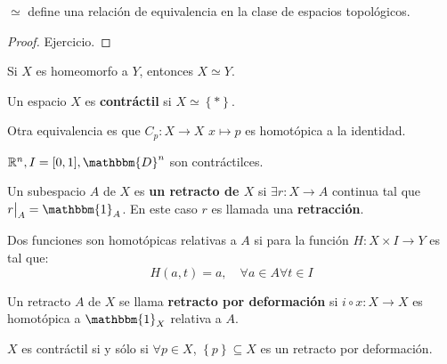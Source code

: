 \documentclass[12pt]{report}
\theoremstyle{largebreak}
\newcommand\cf[3]{\ensuremath{#1:#2\rightarrow#3}}
\newcommand{\bbm}[1]{\ensuremath{\mathbbm{#1}}}
\begin{document}
    \begin{obs}
        $\simeq$ define una relación de equivalencia en la clase de espacios topológicos.
    \end{obs}

    \begin{proof}
        Ejercicio.
    \end{proof}

    \begin{propo}
        Si $X$ es homeomorfo a $Y$, entonces $X\simeq Y$.
    \end{propo}

    \begin{mydef}
        Un espacio $X$ es \textbf{contráctil} si $X\simeq\left\{*\right\}$.
    \end{mydef}

    \begin{obs}
        Otra equivalencia es que $\cf{C_p}{X}{X}$ $x\mapsto p$ es homotópica a la identidad.
    \end{obs}

    \begin{exa}
        $\mathbb{R}^n,I=[0,1],\bbm{D}^n$ son contráctilces.
    \end{exa}

    \begin{mydef}
        Un subespacio $A$ de $X$ es \textbf{un retracto de $X$} si $\exists\cf{r}{X}{A}$ continua tal que $r\big|_A=\bbm{1}_A$. En este caso $r$ es llamada una \textbf{retracción}.
    \end{mydef}

    \begin{mydef}
        Dos funciones son homotópicas relativas a $A$ si para la función $\cf{H}{X\times I}{Y}$ es tal que:
        \begin{equation*}
            H(a,t)=a,\quad\forall a\in A\forall t\in I
        \end{equation*}
    \end{mydef}

    \begin{mydef}
        Un retracto $A$ de $X$ se llama \textbf{retracto por deformación} si $\cf{i\circ x}{X}{X}$ es homotópica a $\bbm{1}_X$ relativa a $A$.
    \end{mydef}

    \begin{exa}
        $X$ es contráctil si y sólo si $\forall p\in X$, $\left\{ p\right\}\subseteq X$ es un retracto por deformación.
    \end{exa}
\end{document}

